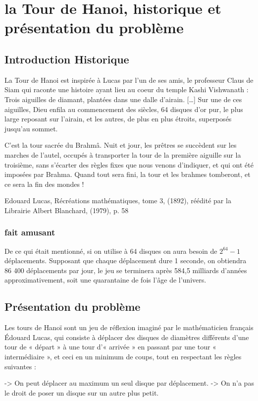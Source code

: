 \chapter{la Tour de Hanoi, historique et présentation du problème}

\section{Introduction Historique}
La Tour de Hanoi est inspirée à Lucas par l’un de ses amis, le professeur Claus de Siam qui raconte une histoire ayant lieu au coeur du temple Kashi Vishwanath :
Trois aiguilles de diamant, plantées dans une dalle d’airain. […] Sur une de ces aiguilles, Dieu enfila au commencement des siècles, 64 disques d’or pur, le plus large reposant sur l’airain, et les autres, de plus en plus étroits, superposés jusqu’au sommet.

C’est la tour sacrée du Brahmâ. Nuit et jour, les prêtres se succèdent sur les marches de l’autel, occupés à transporter la tour de la première aiguille sur la troisième, sans s’écarter des règles fixes que nous venons d’indiquer, et qui ont été imposées par Brahma. Quand tout sera fini, la tour et les brahmes tomberont, et ce sera la fin des mondes !

Edouard Lucas, Récréations mathématiques, tome 3, (1892), réédité par la Librairie Albert Blanchard, (1979), p. 58
\subsection{fait amusant}
De ce qui était mentionné, si on utilise à 64 disques on aura besoin de $2^{64}-1$ déplacements. Supposant que chaque déplacement dure 1 seconde, on obtiendra 86 400 déplacements par jour, le jeu se terminera après 584,5 milliards d'années approximativement, soit une quarantaine de fois l'âge de l'univers.

\section{Présentation du problème}
Les tours de Hanoï sont un jeu de réflexion imaginé par le mathématicien français Édouard Lucas, qui consiste à déplacer des disques de diamètres différents d'une tour de « départ » à une tour d'« arrivée » en passant par une tour « intermédiaire », et ceci en un minimum de coups, tout en respectant les règles suivantes :

-> On peut déplacer au maximum un seul disque par déplacement.
-> On n'a pas le droit de poser un disque sur un autre plus petit.


